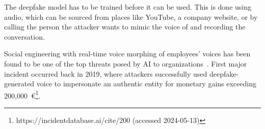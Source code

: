 The deepfake model has to be trained before it can be used. This is done using audio, which can be sourced from places like YouTube, a company website, or by calling the person the attacker wants to mimic the voice of and recording the conversation.


Social engineering with real-time voice morphing of employees' voices has been found to be one of the top threats posed by AI to organizations~\citep{mirsky_Threat_Offensive_AI_Organizations_2023}. First major incident occurred back in 2019, where attackers successfully used deepfake-generated voice to impersonate an authentic entity for monetary gains exceeding 200,000~€\footnote{https://incidentdatabase.ai/cite/200 (accessed 2024-05-13)}.












